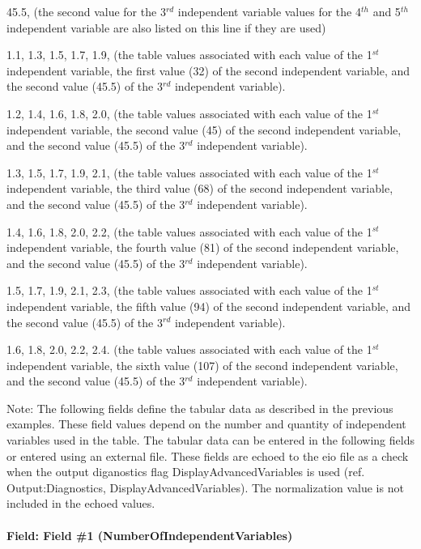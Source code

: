 45.5, (the second value for the 3\(^{rd}\) independent variable values for the 4\(^{th}\) and 5\(^{th}\) independent variable are also listed on this line if they are used)

1.1, 1.3, 1.5, 1.7, 1.9, (the table values associated with each value of the 1\(^{st}\) independent variable, the first value (32) of the second independent variable, and the second value (45.5) of the 3\(^{rd}\) independent variable).

1.2, 1.4, 1.6, 1.8, 2.0, (the table values associated with each value of the 1\(^{st}\) independent variable, the second value (45) of the second independent variable, and the second value (45.5) of the 3\(^{rd}\) independent variable).

1.3, 1.5, 1.7, 1.9, 2.1, (the table values associated with each value of the 1\(^{st}\) independent variable, the third value (68) of the second independent variable, and the second value (45.5) of the 3\(^{rd}\) independent variable).

1.4, 1.6, 1.8, 2.0, 2.2, (the table values associated with each value of the 1\(^{st}\) independent variable, the fourth value (81) of the second independent variable, and the second value (45.5) of the 3\(^{rd}\) independent variable).

1.5, 1.7, 1.9, 2.1, 2.3, (the table values associated with each value of the 1\(^{st}\) independent variable, the fifth value (94) of the second independent variable, and the second value (45.5) of the 3\(^{rd}\) independent variable).

1.6, 1.8, 2.0, 2.2, 2.4. (the table values associated with each value of the 1\(^{st}\) independent variable, the sixth value (107) of the second independent variable, and the second value (45.5) of the 3\(^{rd}\) independent variable).

Note: The following fields define the tabular data as described in the previous examples. These field values depend on the number and quantity of independent variables used in the table. The tabular data can be entered in the following fields or entered using an external file. These fields are echoed to the eio file as a check when the output diganostics flag DisplayAdvancedVariables is used (ref. Output:Diagnostics, DisplayAdvancedVariables). The normalization value is not included in the echoed values.

\paragraph{Field: Field \#1 (NumberOfIndependentVariables)}\label{field-field-1-numberofindependentvariables}

